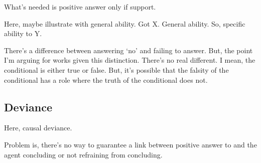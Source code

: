 \begin{note}
  What's needed is positive answer only if support.

  Here, maybe illustrate with general ability.
  Got X.
  General ability.
  So, specific ability to Y.
\end{note}

\begin{note}
  {
    \color{red}
    There's a difference between answering `no' and failing to answer.
    But, the point I'm arguing for works given this distinction.
    There's no real different.
    I mean, the conditional is either true or false.
    But, it's possible that the falsity of the conditional has a role where the truth of the conditional does not.
  }
\end{note}

\subsection{Deviance}
\label{sec:deviance}

\begin{note}
  Here, causal deviance.
\end{note}

\begin{note}
  Problem is, there's no way to guarantee a link between positive answer to \qzS{} and the agent concluding or not refraining from concluding.
\end{note}

